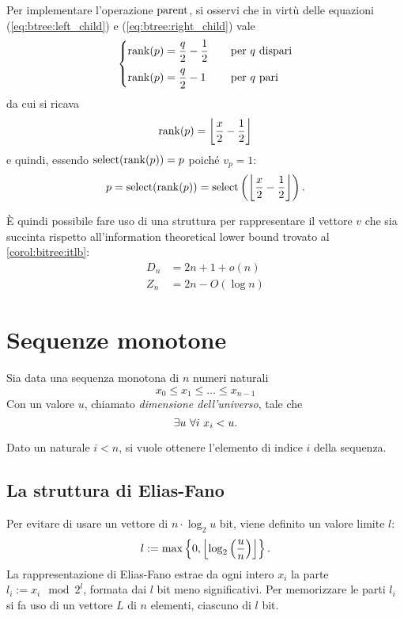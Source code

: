 Per implementare l'operazione $\mathrm{parent}$, si osservi che in virtù delle equazioni (\ref{eq:btree:left_child}) e (\ref{eq:btree:right_child}) vale
\begin{equation*}
	\begin{cases}
		\mathrm{rank}(p)=\dfrac{q}{2}-\dfrac12 & \quad\text{per $q$ dispari} \\[2ex]
		\mathrm{rank}(p)=\dfrac{q}{2}-1        & \quad\text{per $q$ pari}
	\end{cases}
\end{equation*}
da cui si ricava
\begin{equation*}
	\mathrm{rank}(p)=\left\lfloor \frac x2-\frac 12 \right\rfloor
\end{equation*}
e quindi, essendo $\mathrm{select}(\mathrm{rank}(p))=p$ poiché $v_p=1$:
\begin{equation*}
	p=\mathrm{select}(\mathrm{rank}(p))=\mathrm{select}\left(\left\lfloor \frac x2-\frac 12 \right\rfloor\right) \text.
\end{equation*}

È quindi possibile fare uso di una struttura per rappresentare il vettore $v$ che sia succinta rispetto all'information theoretical lower bound trovato al \cref{corol:bitree:itlb}:
\begin{align*}
	D_n & = 2n+1+o(n)    \\
	Z_n & = 2n-O(\log n)
\end{align*}



\section{Sequenze monotone}
Sia data una sequenza monotona di $n$ numeri naturali
\begin{equation*}
	x_0\leq x_1\leq \dots \leq x_{n-1}
\end{equation*}
Con un valore $u$, chiamato \emph{dimensione dell'universo}, tale che
\begin{equation*}
	\exists u ~ \forall i ~ x_i < u \text.
\end{equation*}

Dato un naturale $i<n$, si vuole ottenere l'elemento di indice $i$ della sequenza.


\subsection{La struttura di Elias-Fano}
Per evitare di usare un vettore di $n\cdot\log_2 u$ bit, viene definito un valore limite $l$:
\begin{equation*}
	l := \max\left\{ 0,\left\lfloor \log_2\left(\frac{u}{n}\right) \right\rfloor \right\}\text.
\end{equation*}
La rappresentazione di Elias-Fano estrae da ogni intero $x_i$ la parte $l_i:=x_i\mod 2^l$, formata dai $l$ bit meno significativi. Per memorizzare le parti $l_i$ si fa uso di un vettore $L$ di $n$ elementi, ciascuno di $l$ bit.

